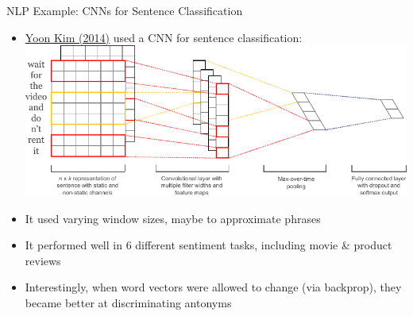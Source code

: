 \documentclass[xcolor=pdftex,x11names,table,hyperref]{beamer}
\begin{document}
\begin{frame}{NLP Example: CNNs for Sentence Classification}
\begin{itemize}
	\item \href{https://www.aclweb.org/anthology/D14-1181.pdf}{Yoon Kim (2014)} used a CNN for sentence classification: \\[1.0em]
	\hspace*{-2.0em}%
	\includegraphics[width=1.02\textwidth]{images/kim2014_fig1.pdf}
	\pause
	\item It used varying window sizes, maybe to approximate phrases
	\pause
	\item It performed well in 6 different sentiment tasks, including movie \& product reviews
	\pause
	\item Interestingly, when word vectors were allowed to change (via backprop), they became better at discriminating antonyms
\end{itemize}
\end{frame}
\end{document}
